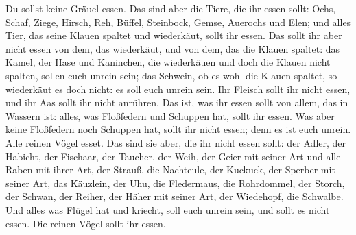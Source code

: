  Du sollst keine Gräuel essen.  Das sind
aber die Tiere, die ihr essen sollt: Ochs, Schaf, Ziege, 
Hirsch, Reh, Büffel, Steinbock, Gemse, Auerochs und Elen; 
und alles Tier, das seine Klauen spaltet und wiederkäut, sollt ihr
essen.  Das sollt ihr aber nicht essen von dem, das
wiederkäut, und von dem, das die Klauen spaltet: das Kamel, der Hase und
Kaninchen, die wiederkäuen und doch die Klauen nicht spalten, sollen
euch unrein sein;  das Schwein, ob es wohl die Klauen
spaltet, so wiederkäut es doch nicht: es soll euch unrein sein. Ihr
Fleisch sollt ihr nicht essen, und ihr Aas sollt ihr nicht anrühren.
 Das ist, was ihr essen sollt von allem, das in Wassern
ist: alles, was Floßfedern und Schuppen hat, sollt ihr essen.
 Was aber keine Floßfedern noch Schuppen hat, sollt ihr
nicht essen; denn es ist euch unrein.  Alle reinen Vögel
esset.  Das sind sie aber, die ihr nicht essen sollt: der
Adler, der Habicht, der Fischaar,  der Taucher, der Weih,
der Geier mit seiner Art  und alle Raben mit ihrer Art,
 der Strauß, die Nachteule, der Kuckuck, der Sperber mit
seiner Art,  das Käuzlein, der Uhu, die Fledermaus,
 die Rohrdommel, der Storch, der Schwan, 
der Reiher, der Häher mit seiner Art, der Wiedehopf, die Schwalbe.
 Und alles was Flügel hat und kriecht, soll euch unrein
sein, und sollt es nicht essen.  Die reinen Vögel sollt
ihr essen.

